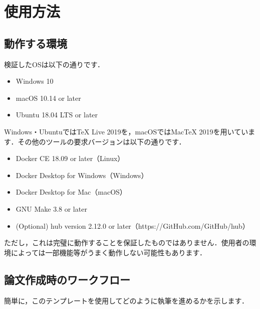 \documentclass[main]{subfiles}
\begin{document}
\section{使用方法}

\subsection{動作する環境}

検証したOSは以下の通りです．

\begin{itemize}
    \item Windows 10
    \item macOS 10.14 or later
    \item Ubuntu 18.04 LTS or later
\end{itemize}

Windows・UbuntuではTeX Live 2019を，macOSではMacTeX 2019を用いています．その他のツールの要求バージョンは以下の通りです．

\begin{itemize}
    \item Docker CE 18.09 or later（Linux）
    \item Docker Desktop for Windows（Windows）
    \item Docker Desktop for Mac（macOS）
    \item GNU Make 3.8 or later
    \item (Optional) hub version 2.12.0 or later（https://GitHub.com/GitHub/hub）
\end{itemize}

ただし，これは完璧に動作することを保証したものではありません．使用者の環境によっては一部機能等がうまく動作しない可能性もあります．

\subsection{論文作成時のワークフロー}

簡単に，このテンプレートを使用してどのように執筆を進めるかを示します．
\end{document}
